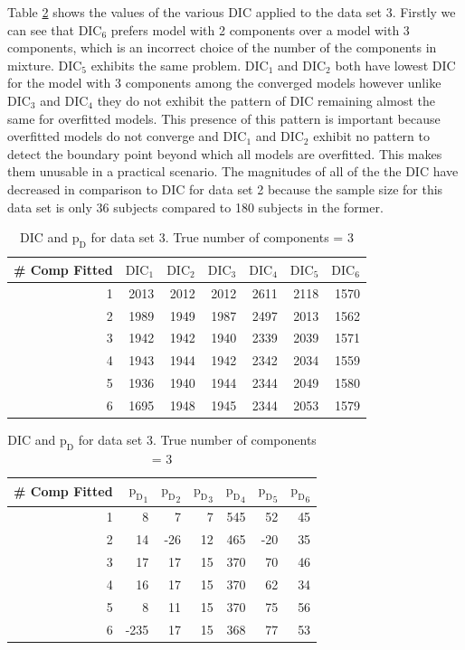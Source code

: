 Table \ref{table : ds_3wellsep_3ppg_dic} shows the values of the various DIC applied to the data set 3. Firstly we can see that $\text{DIC}_6$ prefers model with 2 components over a model with 3 components, which is an incorrect choice of the number of the components in mixture. $\text{DIC}_5$ exhibits the same problem. $\text{DIC}_1$ and $\text{DIC}_2$ both have lowest DIC for the model with 3 components among the converged models however unlike $\text{DIC}_3$ and $\text{DIC}_4$ they do not exhibit the pattern of DIC remaining almost the same for overfitted models. This presence of this pattern is important because overfitted models do not converge and $\text{DIC}_1$ and $\text{DIC}_2$ exhibit no pattern to detect the boundary point beyond which all models are overfitted. This makes them unusable in a practical scenario. The magnitudes of all of the the DIC have decreased in comparison to DIC for data set 2 because the sample size for this data set is only 36 subjects compared to 180 subjects in the former.\\

\begin{table}[!htb]
\centering
\captionsetup{justification=centering}
\caption{DIC and $\text{p}_\text{D}$ for data set 3. True number of components = 3}
\label{table : ds_3wellsep_3ppg_dic}
\begin{tabular}{@{}rrrrrrr@{}}
\toprule
\# Comp Fitted & $\text{DIC}_1$ & $\text{DIC}_2$  & $\text{DIC}_3$  & $\text{DIC}_4$  & $\text{DIC}_5$  & $\text{DIC}_6$  \\ \midrule
1 & 2013 & 2012 & 2012 & 2611 & 2118 & 1570 \\
2 & 1989 & 1949 & 1987 & 2497 & 2013 & 1562 \\
3 & 1942 & 1942 & 1940 & 2339 & 2039 & 1571 \\
4 & 1943 & 1944 & 1942 & 2342 & 2034 & 1559 \\
5 & 1936 & 1940 & 1944 & 2344 & 2049 & 1580 \\
6 & 1695 & 1948 & 1945 & 2344 & 2053 & 1579 \\ \bottomrule
\end{tabular}

\begin{tabular}{@{}rrrrrrr@{}}
\toprule
\# Comp Fitted & ${\text{p}_\text{D}}_1$ & ${\text{p}_\text{D}}_2$ & ${\text{p}_\text{D}}_3$ & ${\text{p}_\text{D}}_4$ & ${\text{p}_\text{D}}_5$ & ${\text{p}_\text{D}}_6$ \\ \midrule
1 & 8 & 7 & 7 & 545 & 52 & 45 \\
2 & 14 & -26 & 12 & 465 & -20 & 35 \\
3 & 17 & 17 & 15 & 370 & 70 & 46 \\
4 & 16 & 17 & 15 & 370 & 62 & 34 \\
5 & 8 & 11 & 15 & 370 & 75 & 56 \\
6 & -235 & 17 & 15 & 368 & 77 & 53 \\ \bottomrule
\end{tabular}
\end{table}


